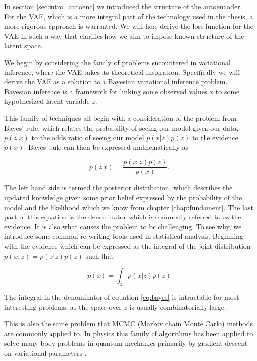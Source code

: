 In section \ref{sec:intro_autoenc} we introduced the structure of the autoencoder. For the VAE, which is a more integral part of the technology used in the thesis, a more rigorous approach is warranted. We will here derive the loss function for the VAE in such a way that clarifies how we aim to impose known structure of the latent space.

We begin by considering the family of problems encountered in variational inference, where the VAE takes its theoretical inspiration. Specifically we will derive the VAE  as a solution to a Bayesian variational inference problem. Bayesian inference is a framework for linking some observed values $x$ to some hypothesized latent variable $z$. 

This family of techniques all begin with a consideration of the problem from Bayes' rule, which relates the probability of seeing our model given our data, $p(z|x)$ to the odds ratio of seeing our model $p(x|z)p(z)$ to the evidence $p(x)$. Bayes' rule can then be expressed mathematically as 

 \begin{equation}\label{eq:bayes}
 p(z| x) = \frac{p(x|z) p(z)}{p(x)}.
 \end{equation}

 \noindent The left hand side is termed the posterior distribution, which describes the updated knowledge given some prior belief expressed by the probability of the model and the likelihood which we know from chapter \ref{chap:fundament}. The last part of this equation is the denominator which is commonly referred to as the evidence. It is also what causes the problem to be challenging. To see why, we introduce some common re-writing tools used in statistical analysis. Beginning with the evidence which can be expressed as the integral of the joint distribution $p(x, z) = p(x|z)p(z)$ such that

\begin{equation}\label{eq:evidence}
p(x) = \int_z p(x|z)p(z)
\end{equation}

\noindent The integral in the denominator of equation \ref{eq:bayes} is intractable for most interesting problems, as the space over $z$ is usually combinatorially large. 

This is also the same problem that MCMC (Markov chain Monte Carlo) methods are commonly applied to. In physics this family of algorithms has been applied to solve many-body problems in quantum mechanics primarily by gradient descent on variational parameters .

